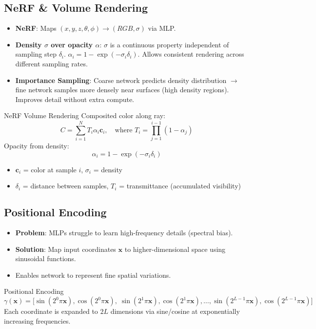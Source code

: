 \documentclass[11pt]{article}
\begin{document}
\subsection{NeRF \& Volume Rendering}
\begin{itemize}
    \item \textbf{NeRF}: Maps $(x,y,z,\theta,\phi) \rightarrow (RGB, \sigma)$ via MLP.
    \item \textbf{Density $\sigma$ over opacity $\alpha$}: $\sigma$ is a continuous property independent of sampling step $\delta_i$. $\alpha_i = 1 - \exp(-\sigma_i \delta_i)$. Allows consistent rendering across different sampling rates.
    \item \textbf{Importance Sampling}: Coarse network predicts density distribution $\rightarrow$ fine network samples more densely near surfaces (high density regions). Improves detail without extra compute.
\end{itemize}

\begin{formulabox}{NeRF Volume Rendering}
Composited color along ray:
$$C = \sum_{i=1}^{N} T_i \alpha_i \mathbf{c}_i, \quad \text{where } T_i = \prod_{j=1}^{i-1} (1 - \alpha_j)$$
Opacity from density:
$$\alpha_i = 1 - \exp(-\sigma_i \delta_i)$$
\begin{itemize}
    \item $\mathbf{c}_i$ = color at sample $i$, $\sigma_i$ = density
    \item $\delta_i$ = distance between samples, $T_i$ = transmittance (accumulated visibility)
\end{itemize}
\end{formulabox}

\subsection{Positional Encoding}
\begin{itemize}
    \item \textbf{Problem}: MLPs struggle to learn high-frequency details (spectral bias).
    \item \textbf{Solution}: Map input coordinates $\mathbf{x}$ to higher-dimensional space using sinusoidal functions.
    \item Enables network to represent fine spatial variations.
\end{itemize}

\begin{formulabox}{Positional Encoding}
$$\gamma(\mathbf{x}) = \big[\sin(2^0 \pi \mathbf{x}), \cos(2^0 \pi \mathbf{x}), \; \sin(2^1 \pi \mathbf{x}), \cos(2^1 \pi \mathbf{x}), \dots, \sin(2^{L-1} \pi \mathbf{x}), \cos(2^{L-1} \pi \mathbf{x})\big]$$
Each coordinate is expanded to $2L$ dimensions via sine/cosine at exponentially increasing frequencies.
\end{formulabox}
\end{document}
